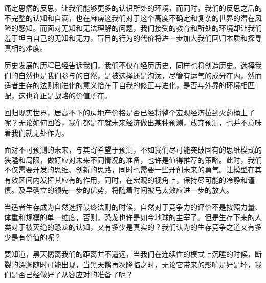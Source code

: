 \documentclass[11pt,a4paper]{article}
\begin{document}
痛定思痛的反思，让我们能够更多的认识所处的环境，而同时，我们的反思之后的不完整的认知和自满，也在麻痹这我们对于这个高度不确定和复杂的世界的潜在风险的感知。而面对无知和无法理解的问题，我们接受的教育和所处的环境却让我们羞于坦白自己的无知和无力，盲目的行为的代价将进一步加大我们回归本质和探寻真相的难度。

历史发展的历程已经告诉我们，我们不仅在经历历史，同样也将创造历史。选择我们的自然也是我们参与的自然，是被选择还是淘汰，尽管有运气的成分在内，然而适者生存的法则和进化的意义恰在于自我的修正与进化，是否与外界的环境相匹配，这也许正是战略的价值所在。

回归现实世界，居高不下的房地产价格是否已经将整个宏观经济拉到火药桶上了呢？无论如何回答，我们都是在就未来经济做出某种预测，放弃预测，也并不意味着我们就无处作为。

面对不可预测的未来，与其寄希望于预测，不如我们尽可能突破固有的思维模式的狭隘和局限，做好应对未来不同情况的准备，也许是值得推荐的策略。此时，我们不仅需要开发的思维、创新的思路，同时也需要一些开创未来的勇气。让模型在其有效区间内发挥其应有的作用，同时，在宏观的视角上，保持尽可能的冷静和谨慎。及早确立的领先一步的优势，将随着时间被马太效应进一步的放大。

当适者生存成为自然选择最终法则的时候，自然对于竞争力的评价不是按照力量、体重和规模的单一维度，否则，恐龙也许是如今地球的主宰了。但是生存下来的人类对于被灭绝的恐龙的认知，又有多少是真实的？我们认为的生存竞争之道又有多少是有价值的呢？

要知道，黑天鹅离我们的距离并不遥远，当我们在连续性的模式上沉睡的时候，断裂的深渊随时可能出现，当黑天鹅再次降临之时，无论它带来的影响是好是坏，我们是否已经做好了从容应对的准备了呢？
\end{document}
